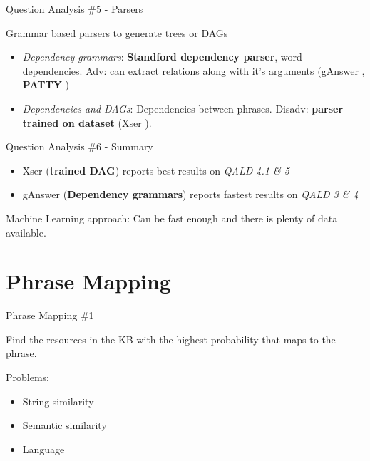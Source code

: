 \documentclass{beamer}
\begin{document}

\begin{frame}{Question Analysis \#5 - Parsers}
  \begin{card}
    Grammar based parsers to generate trees or DAGs
    \begin{itemize}
      \item \textit{Dependency grammars}: \textbf{Standford dependency parser}, word dependencies. Adv: can extract relations along with it's arguments (gAnswer \cite{zou2014a}, \textbf{PATTY} \cite{nakashole2012a})
      \item \textit{Dependencies and DAGs}: Dependencies between phrases. Disadv: \textbf{parser trained on dataset} (Xser \cite{xu2014a}).
    \end{itemize}
  \end{card}
\end{frame}


\begin{frame}{Question Analysis \#6 - Summary}
  \begin{card}
    \begin{itemize}
      \item Xser (\textbf{trained DAG}) reports best results on \textit{QALD 4.1 \& 5}
      \item gAnswer (\textbf{Dependency grammars}) reports fastest results on \textit{QALD 3 \& 4}
    \end{itemize}

    Machine Learning approach: Can be fast enough and there is plenty of data available.
  \end{card}
\end{frame}

\section{Phrase Mapping}

\begin{frame}{Phrase Mapping \#1}
  \begin{card}
    Find the resources in the KB with the highest probability that maps to the phrase.
  \end{card}
  \begin{card}
    Problems:
    \begin{itemize}
      \item String similarity
      \item Semantic similarity
      \item Language
    \end{itemize}
  \end{card}
\end{frame}
\end{document}
